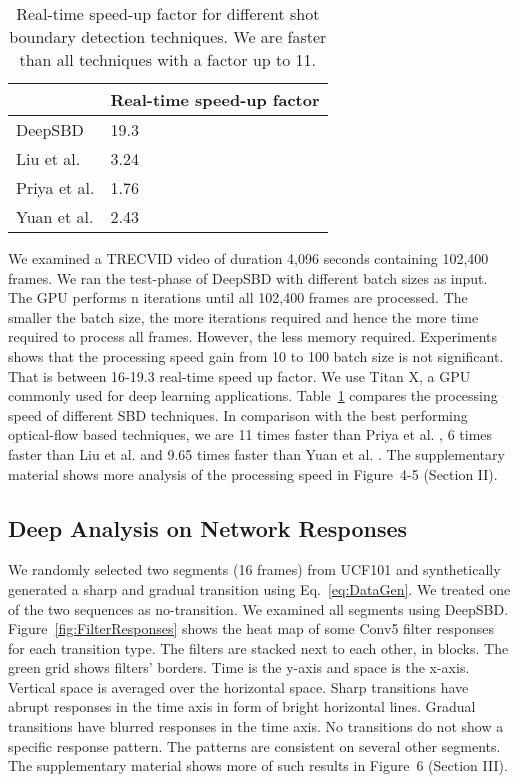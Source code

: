 \documentclass[journal]{IEEEtran}
\begin{document}
\begin{table}
\small
\centering
\begin{tabular}{|l | l |}
     \hline      
												                & Real-time speed-up factor \\
			\hline
			DeepSBD                           & 19.3 \\
      \hline 
			Liu et al. \cite{Liu07,Smeaton10} & 3.24    \\
      \hline
		  Priya et al. \cite{Priya14}   & 1.76  \\
			\hline
			Yuan et al. \cite{Yuan05} & 2.43 \\
			\hline
    \end{tabular}\vspace{3pt}
\caption{Real-time speed-up factor for different shot boundary detection techniques. We are faster than all techniques with a factor up to 11.}   
\label{tab:ProcessingTime}
\end{table}

We examined a TRECVID video of duration 4,096 seconds containing 102,400 frames. We ran the test-phase of DeepSBD with different batch sizes as input. The GPU performs n iterations until all 102,400 frames are processed. The smaller the batch size, the more iterations required and hence the more time required to process all frames. However, the less memory required. Experiments shows that the processing speed gain from 10 to 100 batch size is not significant. That is between 16-19.3 real-time speed up factor. 
We use Titan X, a GPU commonly used for deep learning applications. Table~\ref{tab:ProcessingTime} compares the processing speed of different SBD techniques. In comparison with the best performing optical-flow based techniques, we are 11 times faster than Priya et al. \cite{Priya14}, 6 times faster than Liu et al. \cite{Liu07} and 9.65 times faster than Yuan et al. \cite{Yuan05}. The supplementary material shows more analysis of the processing speed in Figure~4-5 (Section II). 




\subsection{Deep Analysis on Network Responses} We randomly selected two segments (16 frames) from UCF101 and synthetically generated a sharp and gradual transition using Eq.~\ref{eq:DataGen}. We treated one of the two sequences as no-transition. We examined all segments using DeepSBD. 
Figure~\ref{fig:FilterResponses} shows the heat map of some Conv5 filter responses for each transition type. The filters are stacked next to each other, in blocks. The green grid shows filters' borders. Time is the y-axis and space is the x-axis. Vertical space is averaged over the horizontal space. Sharp transitions have abrupt responses in the time axis in form of bright horizontal lines. Gradual transitions have blurred responses in the time axis. No transitions do not show a specific response pattern. The patterns are consistent on several other segments. The supplementary material shows more of such results in Figure~6 (Section III). 
\end{document}
